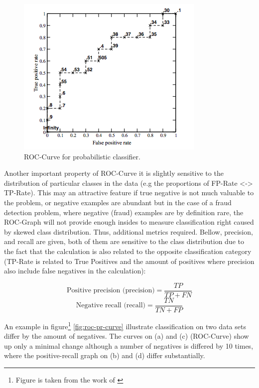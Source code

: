\begin{figure}[h!]
    \centering
    \includegraphics[scale=0.7]{Graphics/roc-curve.png}
    \caption{ROC-Curve for probabilistic classifier.}
    \label{fig:roc-curve}
\end{figure}

Another important property of ROC-Curve it is slightly sensitive to the distribution of particular classes in the data (e.g the proportions of FP-Rate <-> TP-Rate). This may an attractive feature if true negative is not much valuable to the problem, or negative examples are abundant but in the case of a fraud detection problem, where negative (fraud) examples are by definition rare, the ROC-Graph will not provide enough insides to measure classification right caused by skewed class distribution. Thus, additional metrics required.
Bellow, precision, and recall are given, both of them are sensitive to the class distribution due to the fact that the calculation is also related to the opposite classification category (TP-Rate is related to True Positives and the amount of positives where precision also include false negatives in the calculation):

\[ \textrm{Positive precision  (precision)} = \frac{TP}{TP+FN}  \]
\[ \textrm{Negative recall (recall)} = \frac{TN}{TN+FP}  \]

An example in figure\footnote{Figure is taken from the work of \cite{Fawcett:2006:IRA:1159473.1159475}} \ref{fig:roc-pr-curve} illustrate classification on two data sets differ by the amount of negatives. The curves on (a) and (c) (ROC-Curve) show up only a minimal change although a number of negatives is differed by 10 times, where the positive-recall graph on (b) and (d) differ substantially. 

